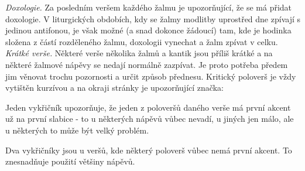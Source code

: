 \documentclass[a5paper, twoside]{article}
\begin{document}
\pagestyle{empty}
\titulniStrankaSvazkuAntifonare

\textit{Doxologie.} Za posledním veršem každého žalmu je  u\-po\-zor\-ňu\-jí\-cí,
že se má přidat doxologie. V liturgických obdobích, kdy se žalmy modlitby uprostřed
dne zpívají s jedinou antifonou, je však možné (a snad dokonce žádoucí)
tam, kde je hodinka složena z částí
rozděleného žalmu, doxologii vynechat a žalm zpívat v celku.\\

\textit{Krátké verše.} Některé verše několika žalmů a kantik jsou příliš krátké a na některé žalmové nápěvy se nedají normálně zazpívat. Je proto potřeba
předem jim věnovat trochu pozornosti a určit způsob přednesu.
Kritický poloverš je vždy vytištěn kurzívou a na okraji stránky je 
upozorňující značka:

Jeden vykřičník upozorňuje, že jeden z poloveršů daného verše má první
akcent už na první slabice - to u některých nápěvů vůbec nevadí, u jiných
jen málo, ale u některých to může být velký problém.

Dva vykřičníky jsou u veršů, kde některý poloverš vůbec nemá první
akcent. To znesnadňuje použití většiny nápěvů.
\newpage

\setlength{\columnseprule}{1pt} %
\setlength{\columnsep}{20pt} %

\titleformat{\subsection}[hang]{\large\bfseries}{}{0pt}{\thetitle\quad}
\titleformat{\subsubsection}[hang]{\bfseries}{}{0pt}{\thetitle\quad}


\fancyhead{}
\fancyhead[LE,RO]{\thepage}
\fancyfoot{}

\pagestyle{fancy}

\end{document}
